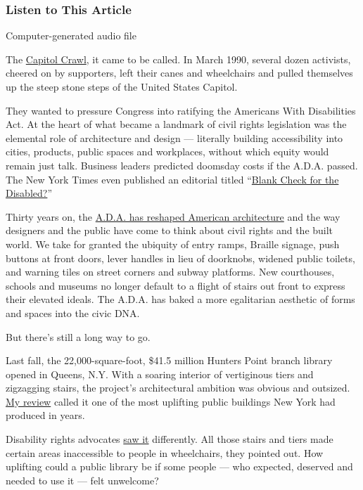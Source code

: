\hypertarget{listen-to-this-article}{%
\subsubsection{Listen to This Article}\label{listen-to-this-article}}

Computer-generated audio file

The \href{https://vimeo.com/328233990}{Capitol Crawl}, it came to be
called. In March 1990, several dozen activists, cheered on by
supporters, left their canes and wheelchairs and pulled themselves up
the steep stone steps of the United States Capitol.

They wanted to pressure Congress into ratifying the Americans With
Disabilities Act. At the heart of what became a landmark of civil rights
legislation was the elemental role of architecture and design ---
literally building accessibility into cities, products, public spaces
and workplaces, without which equity would remain just talk. Business
leaders predicted doomsday costs if the A.D.A. passed. The New York
Times even published an editorial titled
``\href{https://www.nytimes.com/1989/09/06/opinion/blank-check-for-the-disabled.html}{Blank
Check for the Disabled?}''

Thirty years on, the
\href{https://www.curbed.com/2015/7/23/9937976/how-the-americans-with-disabilities-act-transformed-architecture}{A.D.A.
has reshaped American architecture} and the way designers and the public
have come to think about civil rights and the built world. We take for
granted the ubiquity of entry ramps, Braille signage, push buttons at
front doors, lever handles in lieu of doorknobs, widened public toilets,
and warning tiles on street corners and subway platforms. New
courthouses, schools and museums no longer default to a flight of stairs
out front to express their elevated ideals. The A.D.A. has baked a more
egalitarian aesthetic of forms and spaces into the civic DNA.

But there's still a long way to go.

Last fall, the 22,000-square-foot, \$41.5 million Hunters Point branch
library opened in Queens, N.Y. With a soaring interior of vertiginous
tiers and zigzagging stairs, the project's architectural ambition was
obvious and outsized.
\href{https://www.nytimes.com/2019/09/18/arts/design/hunters-point-community-library.html}{My
review} called it one of the most uplifting public buildings New York
had produced in years.

Disability rights advocates
\href{https://gothamist.com/news/new-41-million-hunters-point-library-has-one-major-flaw}{saw
it} differently. All those stairs and tiers made certain areas
inaccessible to people in wheelchairs, they pointed out. How uplifting
could a public library be if some people --- who expected, deserved and
needed to use it --- felt unwelcome?

